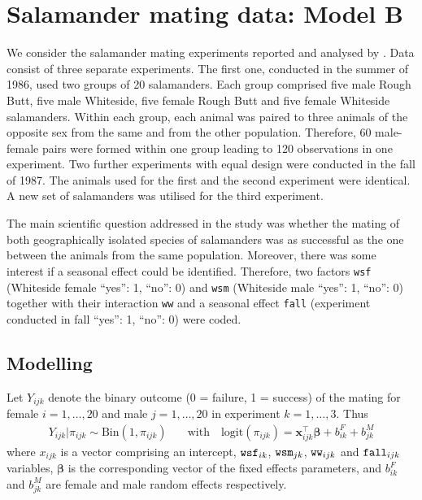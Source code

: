 \documentclass[a4paper,11pt]{article}
\begin{document}
\section*{Salamander mating data: Model B}

We consider the salamander mating experiments reported and analysed
by \citet[Section 14.5]{Mccullagh-nelder-1983}. 
Data consist of three separate experiments. The first one, conducted in 
the summer of 1986, used two groups of 20 salamanders. Each group comprised 
five male Rough Butt, five male 
Whiteside, five female Rough Butt and five female Whiteside salamanders. 
Within each group, each animal was paired to three animals of the opposite 
sex from the same and from the other population. Therefore, 60 male-female 
pairs were formed within one group leading to 120 observations in one
experiment. Two further experiments with equal design were conducted in 
the fall of 1987. The animals used for the first and the second experiment 
were identical. A new set of salamanders was utilised for the third experiment. 

The main scientific question addressed in the study was whether the mating 
of both geographically isolated species of salamanders was as successful 
as the one between the animals from the same population. Moreover, there 
was some interest if a seasonal effect could be identified. Therefore, 
two factors {\tt wsf} (Whiteside female ``yes'': 1, ``no'': 0) 
and {\tt wsm} (Whiteside male ``yes'': 1, ``no'': 0) together with their
interaction {\tt ww} and a seasonal effect {\tt fall} (experiment conducted in 
fall ``yes'': 1, ``no'': 0) were coded. 

\subsection*{Modelling}
 
Let $Y_{ijk}$ denote the binary outcome (0 = failure, 1 = success) of the 
mating for female $i=1, \ldots, 20$ and male $j=1,\ldots, 20$ in 
experiment $k=1, \ldots, 3$.  Thus
\begin{align*}
   Y_{ijk}|\pi_{ijk} \sim  \text{Bin}(1, \pi_{ijk})&  \quad \text{with} \quad
   \text{logit}({\pi_{ijk}}) = \bm{x}_{ijk}^\top \bm{\beta} + b_{ik}^F + b_{jk}^M
\end{align*}
where $x_{ijk}$ is a vector comprising an intercept, ${\tt wsf}_{ik}$, 
${\tt wsm}_{jk}$, ${\tt ww}_{ijk}$ and ${\tt fall}_{ijk}$ variables, 
$\bm{\beta}$ is the corresponding vector of the fixed effects parameters, 
and $b_{ik}^F$ and $b_{jk}^M$ are female and male random effects respectively.
\end{document}

